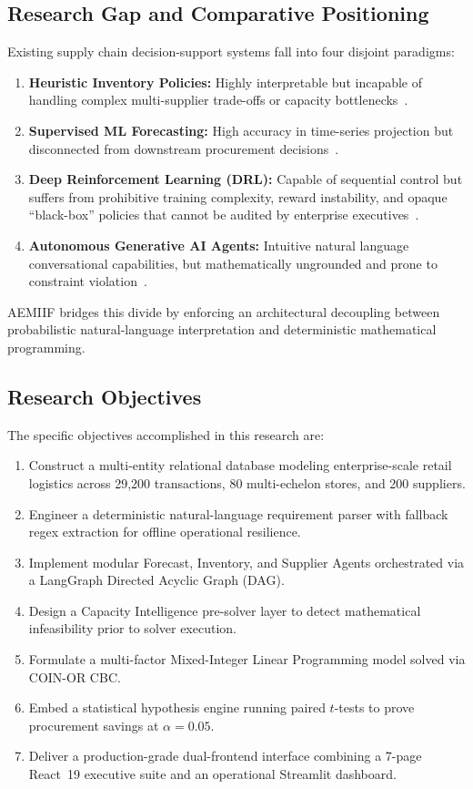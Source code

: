 \documentclass[conference]{IEEEtran}
\begin{document}
\subsection{Research Gap and Comparative Positioning}
Existing supply chain decision-support systems fall into four disjoint paradigms:
\begin{enumerate}
    \item \textbf{Heuristic Inventory Policies:} Highly interpretable but incapable of handling complex multi-supplier trade-offs or capacity bottlenecks~\cite{axsater2015}.
    \item \textbf{Supervised ML Forecasting:} High accuracy in time-series projection but disconnected from downstream procurement decisions~\cite{wang2023, chen2016}.
    \item \textbf{Deep Reinforcement Learning (DRL):} Capable of sequential control but suffers from prohibitive training complexity, reward instability, and opaque ``black-box'' policies that cannot be audited by enterprise executives~\cite{chen2022, gijsbrechts2022}.
    \item \textbf{Autonomous Generative AI Agents:} Intuitive natural language conversational capabilities, but mathematically ungrounded and prone to constraint violation~\cite{invagent2024, wu2025}.
\end{enumerate}

AEMIIF bridges this divide by enforcing an architectural decoupling between probabilistic natural-language interpretation and deterministic mathematical programming.

\subsection{Research Objectives}
The specific objectives accomplished in this research are:
\begin{enumerate}
    \item Construct a multi-entity relational database modeling enterprise-scale retail logistics across 29,200 transactions, 80 multi-echelon stores, and 200 suppliers.
    \item Engineer a deterministic natural-language requirement parser with fallback regex extraction for offline operational resilience.
    \item Implement modular Forecast, Inventory, and Supplier Agents orchestrated via a LangGraph Directed Acyclic Graph (DAG).
    \item Design a Capacity Intelligence pre-solver layer to detect mathematical infeasibility prior to solver execution.
    \item Formulate a multi-factor Mixed-Integer Linear Programming model solved via COIN-OR CBC.
    \item Embed a statistical hypothesis engine running paired $t$-tests to prove procurement savings at $\alpha = 0.05$.
    \item Deliver a production-grade dual-frontend interface combining a 7-page React~19 executive suite and an operational Streamlit dashboard.
\end{enumerate}
\end{document}
